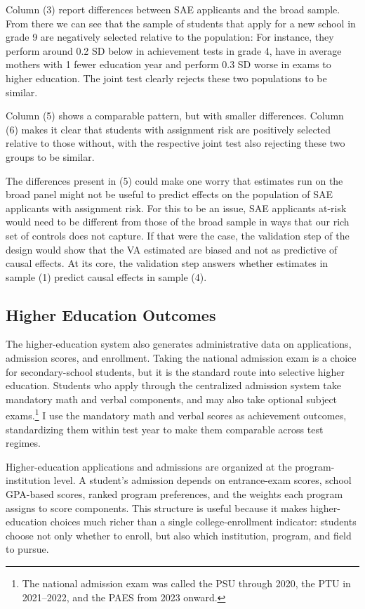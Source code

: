 \documentclass[a4paper, article, english, oneside, unknownkeysallowed, 12pt]{memoir}
\begin{document}



Column (3) report differences between SAE applicants and the broad sample. 
From there we can see that the sample of students that apply for a new school in grade 9 are negatively selected relative to the population:
For instance, they perform around 0.2 SD below in achievement tests in grade 4, have in average mothers with 1 fewer education year and perform 0.3 SD worse in exams to higher education.
The joint test clearly rejects these two populations to be similar.

Column (5) shows a comparable pattern, but with smaller differences.
Column (6) makes it clear that students with assignment risk are positively selected relative to those without, 
with the respective joint test also rejecting these two groups to be similar. 

The differences present in (5) could make one worry that estimates run on the broad panel might not be useful to predict effects on the population of SAE applicants with assignment risk.
For this to be an issue, SAE applicants at-risk would need to be different from those of the broad sample in ways that our rich set of controls does not capture. 
If that were the case, the validation step of the design would show that the VA estimated are biased and not as predictive of causal effects.
At its core, the validation step answers whether estimates in sample (1) predict causal effects in sample (4).


\subsection{Higher Education Outcomes}

The higher-education system also generates administrative data on applications, admission scores, and enrollment.
Taking the national admission exam is a choice for secondary-school students, but it is the standard route into selective higher education.
Students who apply through the centralized admission system take mandatory math and verbal components, and may also take optional subject exams.\footnote{The national admission exam was called the PSU through 2020, the PTU in 2021--2022, and the PAES from 2023 onward.}
I use the mandatory math and verbal scores as achievement outcomes, standardizing them within test year to make them comparable across test regimes.

Higher-education applications and admissions are organized at the program-institution level.
A student's admission depends on entrance-exam scores, school GPA-based scores, ranked program preferences, and the weights each program assigns to score components.
This structure is useful because it makes higher-education choices much richer than a single college-enrollment indicator: students choose not only whether to enroll, but also which institution, program, and field to pursue.
\end{document}
